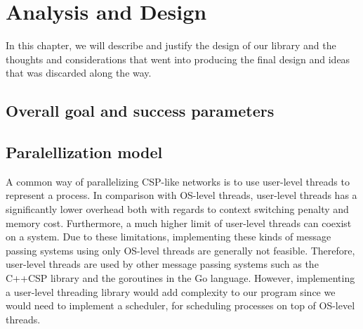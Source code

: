 \chapter{Analysis and Design}
In this chapter, we will describe and justify the design of our
library and the thoughts and considerations that went into producing
the final design and ideas that was discarded along the way.

\section{Overall goal and success parameters}





\section{Paralellization model}
A common way of parallelizing CSP-like networks is to use user-level
threads to represent a process. In comparison with OS-level threads,
user-level threads has a significantly lower overhead both with
regards to context switching penalty \cite{sung2002comparative} and
memory cost. Furthermore, a  much higher limit of user-level threads can
coexist on a system. Due to these limitations, implementing these kinds of
message passing systems using only OS-level threads are generally not
feasible. Therefore, user-level threads are used by other message
passing systems such as the C++CSP library\cite{brown2003introduction}
and the goroutines in the Go
language\cite{deshpandeanalysis}. However, implementing a user-level
threading library would add complexity to our program since we would
need to implement a scheduler, for scheduling processes on top of
OS-level threads.

